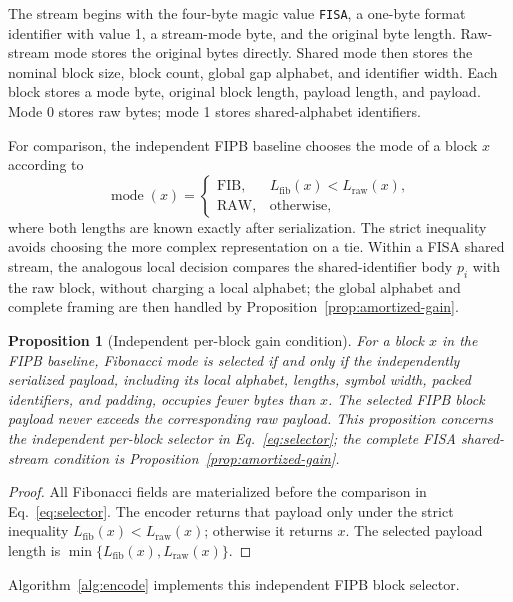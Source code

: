 \documentclass[a4paper,fleqn]{cas-dc}
\newtheorem{proposition}{Proposition}
\begin{document}
The stream begins with the four-byte magic value \texttt{FISA}, a one-byte
format identifier with value 1, a stream-mode byte, and the original byte
length. Raw-stream mode stores the original bytes directly. Shared mode then
stores the nominal block size, block count, global gap alphabet, and identifier
width. Each block stores a mode byte, original block length, payload length,
and payload. Mode 0 stores raw bytes; mode 1 stores shared-alphabet identifiers.

For comparison, the independent FIPB baseline chooses the mode of a block
$x$ according to
\begin{equation}
\operatorname{mode}(x)=
\begin{cases}
\mathrm{FIB},&L_{\mathrm{fib}}(x)<L_{\mathrm{raw}}(x),\\
\mathrm{RAW},&\text{otherwise},
\end{cases}
\label{eq:selector}
\end{equation}
where both lengths are known exactly after serialization. The strict
inequality avoids choosing the more complex representation on a tie.
Within a FISA shared stream, the analogous local decision compares the
shared-identifier body $p_i$ with the raw block, without charging a local
alphabet; the global alphabet and complete framing are then handled by
Proposition~\ref{prop:amortized-gain}.

\begin{proposition}[Independent per-block gain condition]
\label{prop:gain}
For a block $x$ in the FIPB baseline, Fibonacci mode is selected if and only
if the independently serialized payload, including its local alphabet,
lengths, symbol width, packed identifiers, and padding, occupies fewer bytes
than $x$. The selected FIPB block payload never exceeds the
corresponding raw payload. This proposition concerns the independent
per-block selector in Eq.~\eqref{eq:selector}; the complete FISA shared-stream
condition is Proposition~\ref{prop:amortized-gain}.
\end{proposition}

\begin{proof}
All Fibonacci fields are materialized before the comparison in
Eq.~\eqref{eq:selector}. The encoder returns that payload only under the strict
inequality $L_{\mathrm{fib}}(x)<L_{\mathrm{raw}}(x)$; otherwise it returns
$x$. The selected payload length is
$\min\{L_{\mathrm{fib}}(x),L_{\mathrm{raw}}(x)\}$.
\end{proof}

Algorithm~\ref{alg:encode} implements this independent FIPB block selector.
\end{document}

